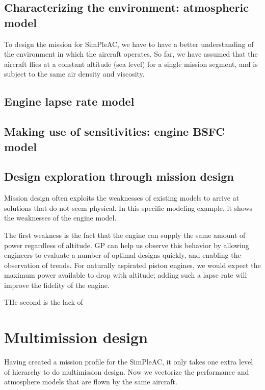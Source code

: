 \subsection{Characterizing the environment: atmospheric model}

To design the mission for SimPleAC, we have to have a better understanding
of the environment in which the aircraft operates. So far, we have assumed that
the aircraft flies at a constant altitude (sea level) for a single mission segment,
and is subject to the same air density and viscosity.

\subsection{Engine lapse rate model}

\subsection{Making use of sensitivities: engine BSFC model}

\subsection{Design exploration through mission design}

Mission design often exploits the weaknesses of existing models to arrive at solutions
that do not seem physical. In this
specific modeling example, it shows the weaknesses of the engine model.


The first weakness is the fact that the engine can supply the same amount of power
regardless of altitude. \gls{GP} can help us observe this behavior by allowing engineers to
evaluate a number of optimal designs quickly, and enabling the observation of trends.
For naturally aspirated piston engines, we would expect the maximum power available to
drop with altitude; adding such a lapse rate will improve the fidelity of the engine.

THe second is the lack of

\section{Multimission design}

Having created a mission profile for the SimPleAC, it only takes one extra level of
hierarchy to do multimission design. Now we vectorize the performance
and atmosphere models that are flown by the same aircraft.


